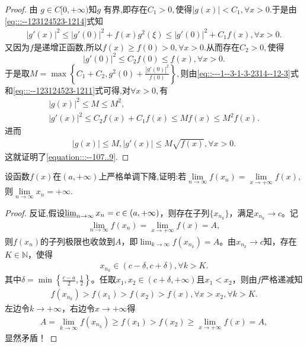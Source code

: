 \documentclass[../../main.tex]{subfiles}%
\begin{document}
\begin{proof}
由 \( g\in C[0,+\infty) \)知$g$ 有界,即存在$C_1>0,$使得$|g(x)|<C_1,\forall x>0.$于是由\eqref{eq:::--123124523-1214}式知
\begin{align}
\left| g' (x) \right|^2\leqslant \left| g' (0) \right|^2+f(x)g^2(\xi )\leqslant \left| g' (0) \right|^2+C_1f(x),\forall x>0.\label{eq::---1--3-1-3-2314--12-3}
\end{align}
又因为$f$是递增正函数,所以$f(x)\geqslant f(0)>0,\forall x>0.$从而存在$C_2>0,$使得
$$
|g'(0)|^2\leqslant C_2f(0)\leqslant f(x),\forall x>0.
$$
于是取$M=\max \left\{ C_1+C_2,g^2(0)+\frac{\left| g' (0) \right|^2}{f(0)} \right\},$则由\eqref{eq::---1--3-1-3-2314--12-3}式和\eqref{eq:::--123124523-1211}式可得,对$\forall x>0,$有
\begin{gather*}
\left| g\left( x \right) \right|^2\leqslant M\leqslant M^2,
\\
\left| g' (x) \right|^2\leqslant C_2f\left( x \right) +C_1f(x)\leqslant Mf\left( x \right) \leqslant M^2f\left( x \right) .
\end{gather*}
进而
\begin{align*}
\left| g\left( x \right) \right|\leqslant M,\left| g'(x) \right|\leqslant M\sqrt{f\left( x \right)},\forall x>0.
\end{align*}
这就证明了\eqref{equation:::--107..9}.
\end{proof}

\begin{example}
设函数$f(x)$在$(a,+\infty)$上严格单调下降,证明:若$\lim\limits_{n \to \infty} f(x_n)=\lim\limits_{x \to +\infty} f(x)$,则$\lim\limits_{n \to \infty} x_n=+\infty$. 
\end{example}
\begin{proof}
反证,假设$\varliminf_{n\rightarrow \infty}x_n=c\in \left( a,+\infty \right)$，则存在子列$\{ x_{n_k} \}$，满足$x_{n_k}\rightarrow c$。记
\begin{align*}
\lim_{n\rightarrow \infty}f\left( x_n \right) =\lim_{x\rightarrow +\infty}f\left( x \right) =A,
\end{align*}
则$f\left( x_n \right)$的子列极限也收敛到$A$，即$\lim_{k\rightarrow \infty}f\left( x_{n_k} \right) =A$。由$x_{n_k}\rightarrow c$知，存在$K\in \mathbb{N}$，使得
\begin{align*}
x_{n_k}\in \left( c-\delta ,c+\delta \right),\forall k>K.
\end{align*}
其中$\delta =\min \left\{ \frac{c-a}{2},\frac{1}{2} \right\}$。任取$x_1,x_2\in \left( c+\delta ,+\infty \right)$且$x_1<x_2$，则由$f$严格递减知
\begin{align*}
f\left( x_{n_k} \right) >f\left( x_1 \right) >f\left( x_2 \right) >f\left( x \right),\forall x>x_2,\forall k>K.
\end{align*}
左边令$k\rightarrow +\infty$，右边令$x\rightarrow +\infty$得
\begin{align*}
A=\lim_{k\rightarrow \infty}f\left( x_{n_k} \right) \geqslant f\left( x_1 \right) >f\left( x_2 \right) \geqslant \lim_{x\rightarrow +\infty}f\left( x \right) =A,
\end{align*}
显然矛盾！
\end{proof}
\end{document}
